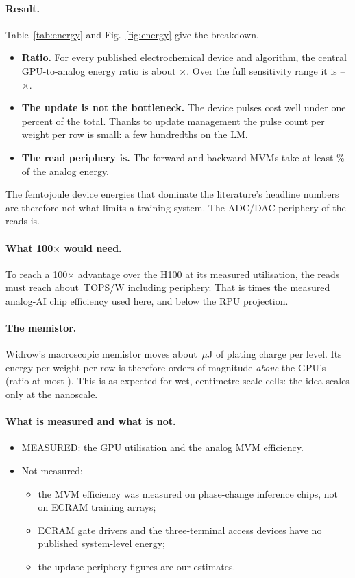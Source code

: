 \paragraph{Result.} Table~\ref{tab:energy} and Fig.~\ref{fig:energy} give the breakdown.
\begin{itemize}
\item \textbf{Ratio.} For every published electrochemical device and algorithm, the central GPU-to-analog energy ratio is about
      \REnRatioMin$\times$. Over the full sensitivity range it is \REnRangeLo--\REnRangeHi$\times$.
\item \textbf{The update is not the bottleneck.} The device pulses cost well under one percent of the total. Thanks to update
      management the pulse count per weight per row is small: a few hundredths on the LM.
\item \textbf{The read periphery is.} The forward and backward MVMs take at least \REnMvmShareMin\% of the analog energy.
\end{itemize}
The femtojoule device energies that dominate the literature's headline numbers are therefore not what limits a training
system. The ADC/DAC periphery of the reads is.

\paragraph{What 100$\times$ would need.} To reach a 100$\times$ advantage over the H100 at its measured utilisation, the reads
must reach about \REnNeedTops\,TOPS/W including periphery. That is \REnNeedOverMeas{} times the measured analog-AI chip efficiency
used here, and below the RPU projection.

\paragraph{The memistor.} Widrow's macroscopic memistor moves about \RWidrowLevelUJ\,$\mu$J of plating charge per level. Its
energy per weight per row is therefore orders of magnitude \emph{above} the GPU's (ratio at most \REnWidrowRatio). This is as
expected for wet, centimetre-scale cells: the idea scales only at the nanoscale.

\paragraph{What is measured and what is not.}
\begin{itemize}
\item MEASURED: the GPU utilisation and the analog MVM efficiency.
\item Not measured:
      \begin{itemize}
      \item the MVM efficiency was measured on phase-change inference chips, not on ECRAM training arrays;
      \item ECRAM gate drivers and the three-terminal access devices have no published system-level energy;
      \item the update periphery figures are our estimates.
      \end{itemize}
\end{itemize}

